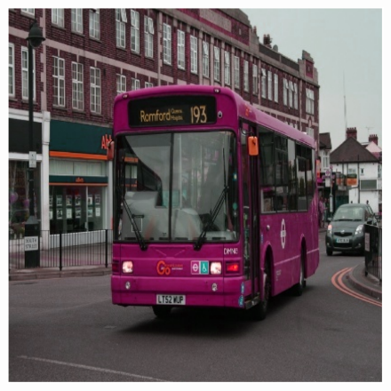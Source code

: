 \begin{figure}[!b]
{        \includegraphics[scale=\scalevaraugmentation]{images/hue.png}%
        \label{hue}%
        }%
    \hfill%
\end{figure}
